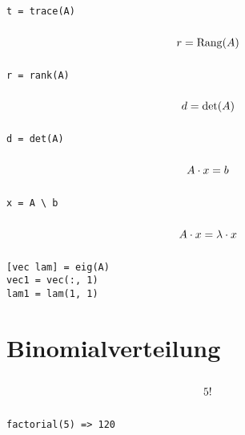 \documentclass
[
  fontsize = 11pt,
  parskip  = half-,
  BCOR     = 0pt,
  DIV      = 11,
  ngerman
]
{scrartcl}
\begin{document}
\hfill
\begin{minipage}{\cw}
\begin{verbatim}
t = trace(A)
\end{verbatim}
\end{minipage}
\begin{minipage}{\mw}
  \begin{equation*}
    \vphantom{\bigg(}%
    r=\operatorname{Rang}(A)
  \end{equation*}
\end{minipage}%
\hfill
\begin{minipage}{\cw}
\begin{verbatim}
r = rank(A)
\end{verbatim}
\end{minipage}
\begin{minipage}{\mw}
  \begin{equation*}
    \vphantom{\bigg(}%
    d=\det(A)
  \end{equation*}
\end{minipage}%
\hfill
\begin{minipage}{\cw}
\begin{verbatim}
d = det(A)
\end{verbatim}
\end{minipage}
\begin{minipage}{\mw}
  \begin{equation*}
    \vphantom{\bigg(}%
    A\cdot x=b
  \end{equation*}
\end{minipage}%
\hfill
\begin{minipage}{\cw}
\begin{verbatim}
x = A \ b
\end{verbatim}
\end{minipage}

\begin{minipage}{\mw}
  \begin{equation*}
    \vphantom{\bigg(}%
    A\cdot x=\lambda\cdot x
  \end{equation*}
\end{minipage}%
\hfill
\begin{minipage}{\cw}
\begin{verbatim}
[vec lam] = eig(A)
vec1 = vec(:, 1)
lam1 = lam(1, 1)
\end{verbatim}
\end{minipage}

\section{Binomialverteilung}
\begin{minipage}{\mw}
  \begin{equation*}
    \vphantom{\bigg(}%
    5!
  \end{equation*}
\end{minipage}%
\hfill
\begin{minipage}{\cw}
\begin{verbatim}
factorial(5) => 120
\end{verbatim}
\end{minipage}
\end{document}
